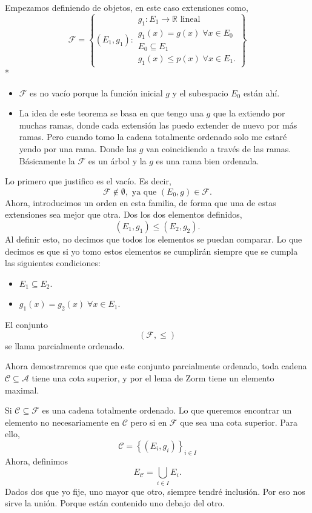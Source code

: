 \begin{paracol}{2}
\begin{teo}
	Empezamos definiendo de objetos, en este caso extensiones como,
	$$\mathscr{F}=\left\{(E_1,g_1):
	    \begin{array}{l}
		g_1:E_1\to \mathbb{R} \text{ lineal}\\
		g_1(x)=g(x)\; \forall x\in E_0\\
		E_0\subseteq E_1\\
		g_1(x)\leq p(x)\; \forall x\in E_1.
	    \end{array}
	\right\}$$
\switchcolumn[1]*{\noindent\scriptsize
    \begin{itemize}
	\item $\mathscr{F}$ es no vacío porque la función inicial $g$ y el subespacio $E_0$ están ahí.
	\item La idea de este teorema se basa en que tengo una $g$ que la extiendo por muchas ramas, donde cada extensión las puedo extender de nuevo por más ramas. Pero cuando tomo la cadena totalmente ordenado solo me estaré yendo por una rama. Donde las $g$ van coincidiendo a través de las ramas. Básicamente la $\mathscr{F}$ es un árbol y la $g$ es una rama bien ordenada.
    \end{itemize}
}
\switchcolumn[0]\noindent
	Lo primero que justifico es el vacío. Es decir, 
	$$\mathscr{F}\notin \emptyset,\text{ ya que } (E_0,g)\in \mathscr{F}.$$
	Ahora, introducimos un orden en esta familia, de forma que una de estas extensiones sea mejor que otra. Dos los dos elementos definidos, 
	$$(E_1,g_1)\leq (E_2,g_2).$$
	Al definir esto, no decimos que todos los elementos se puedan comparar. Lo que decimos es que si yo tomo estos elementos se cumplirán siempre que se cumpla las siguientes condiciones:
	\begin{itemize}
	    \item $E_1\subseteq E_2$.
	    \item $g_1(x)=g_2(x)\; \forall x\in E_1.$
	\end{itemize}
	El conjunto 
	$$\left(\mathscr{F},\leq\right)$$
	se llama parcialmente ordenado.

	Ahora demostraremos que que este conjunto parcialmente ordenado, toda cadena $\mathscr{C}\subseteq \mathscr{A}$ tiene una cota superior, y por el lema de Zorm tiene un elemento maximal.

	Si $\mathscr{C}\subseteq \mathscr{F}$ es una cadena totalmente ordenado. Lo que queremos encontrar un elemento no necesariamente en $\mathscr{C}$ pero si en $\mathscr{F}$ que sea una cota superior. Para ello,
	$$\mathscr{C}=\left\{\left(E_i,g_i\right)\right\}_{i\in I}$$
	Ahora, definimos 
	$$E_{\mathscr{C}}=\bigcup_{i\in I} E_i.$$
	Dados dos que yo fije, uno mayor que otro, siempre tendré inclusión. Por eso nos sirve la unión. Porque están contenido uno debajo del otro.


\end{teo}
\end{paracol}
